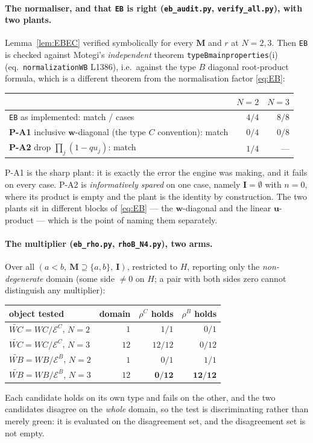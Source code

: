 \documentclass[11pt]{article}
\theoremstyle{plain}
\theoremstyle{definition}
\theoremstyle{remark}
\theoremstyle{plain}
\newcommand{\bI}{\mathbf{I}}
\newcommand{\bM}{\mathbf{M}}
\newcommand{\bu}{\mathbf{u}}
\newcommand{\bw}{\mathbf{w}}
\begin{document}
\paragraph{The normaliser, and that \texttt{EB} is right (\texttt{eb\_audit.py},
\texttt{verify\_all.py}), with two plants.}
Lemma~\ref{lem:EBEC} verified symbolically for every $\bM$ and $r$ at $N=2,3$.
Then \texttt{EB} is checked against Motegi's \emph{independent} theorem
\texttt{typeBmainproperties}(i) (eq.\ \texttt{normalizationWB} L1386), i.e.\
against the type $B$ diagonal root-product formula, which is a different theorem
from the normalisation factor \eqref{eq:EB}:
\begin{center}
\begin{tabular}{@{}lrr@{}}
\toprule
 & $N=2$ & $N=3$ \\
\midrule
\texttt{EB} as implemented: match / cases & $4/4$ & $8/8$ \\
\textbf{P-A1} inclusive $\bw$-diagonal (the type $C$ convention): match & $0/4$ & $0/8$ \\
\textbf{P-A2} drop $\prod_j(1-qu_j)$: match & $1/4$ & --- \\
\bottomrule
\end{tabular}
\end{center}
P-A1 is the sharp plant: it is exactly the error the engine was making, and it
fails on every case.  P-A2 is \emph{informatively spared} on one case, namely
$\bI=\emptyset$ with $n=0$, where its product is empty and the plant is the
identity by construction.  The two plants sit in different blocks of
\eqref{eq:EB} --- the $\bw$-diagonal and the linear $\bu$-product --- which is
the point of naming them separately.

\paragraph{The multiplier (\texttt{eb\_rho.py}, \texttt{rhoB\_N4.py}), two arms.}
Over all $(a<b,\ \bM\supseteq\{a,b\},\ \bI)$, restricted to $H$, reporting only
the \emph{non-degenerate} domain (some side $\ne0$ on $H$; a pair with both
sides zero cannot distinguish any multiplier):
\begin{center}
\begin{tabular}{@{}lrrr@{}}
\toprule
object tested & domain & $\rho^C$ holds & $\rho^B$ holds \\
\midrule
$\widetilde{WC}=WC/\mathcal{E}^C$, $N=2$ & $1$ & $1/1$ & $0/1$ \\
$\widetilde{WC}=WC/\mathcal{E}^C$, $N=3$ & $12$ & $12/12$ & $0/12$ \\
$\widetilde{WB}=WB/\mathcal{E}^B$, $N=2$ & $1$ & $0/1$ & $1/1$ \\
$\widetilde{WB}=WB/\mathcal{E}^B$, $N=3$ & $12$ & $\mathbf{0/12}$ & $\mathbf{12/12}$ \\
\bottomrule
\end{tabular}
\end{center}
Each candidate holds on its own type and fails on the other, and the two
candidates disagree on the \emph{whole} domain, so the test is discriminating
rather than merely green: it is evaluated on the disagreement set, and the
disagreement set is not empty.
\end{document}
